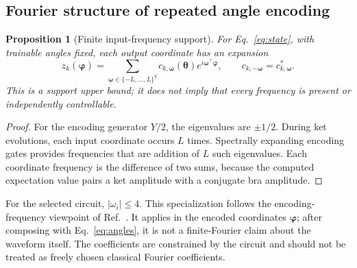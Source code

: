 \documentclass[10pt,a4paper]{article}
\newtheorem{proposition}{Proposition}
\begin{document}
\subsection{Fourier structure of repeated angle encoding}
\begin{proposition}[Finite input-frequency support]\label{prop:fourier}
For Eq.~\eqref{eq:state}, with trainable angles fixed, each output coordinate has an expansion
\begin{equation}
z_k(\boldsymbol\varphi)=\sum_{\boldsymbol\omega\in\{-L,\ldots,L\}^{q}}
c_{k,\boldsymbol\omega}(\boldsymbol\theta)e^{i\boldsymbol\omega^\top\boldsymbol\varphi},
\qquad c_{k,-\boldsymbol\omega}=c_{k,\boldsymbol\omega}^{*}.
\end{equation}
This is a support upper bound; it does not imply that every frequency is present or independently controllable.
\end{proposition}
\begin{proof}

For the encoding generator $Y/2$, the eigenvalues are $\pm1/2$. During ket evolutions, each input coordinate occurs $L$ times. Spectrally expanding encoding gates provides frequencies that are addition of $L$ such eigenvalues. Each coordinate frequency is the difference of two sums, because the computed expectation value pairs a ket amplitude with a conjugate bra amplitude. 
\end{proof}

For the selected circuit, $|\omega_i|\leq4$. This specialization follows the encoding-frequency viewpoint of Ref.~\cite{fourier}. It applies in the encoded coordinates $\boldsymbol\varphi$; after composing with Eq.~\eqref{eq:angles}, it is not a finite-Fourier claim about the waveform itself. The coefficients are constrained by the circuit and should not be treated as freely chosen classical Fourier coefficients.
\end{document}
